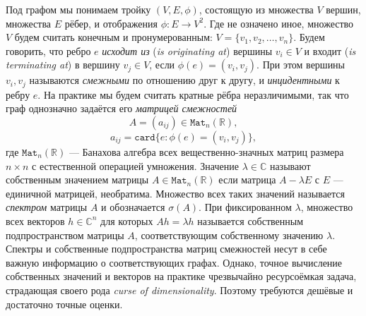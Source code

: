 \documentclass[14pt,a4paper]{extarticle}
\numberwithin{equation}{section}
\theoremstyle{definition}
\begin{document}
Под графом мы понимаем тройку \((V, E, \phi)\), состоящую
из множества \( V \) вершин, множества \( E \) рёбер,
и отображения \( \phi: E\to V^2\). Где не означено иное,
множество \( V \) будем считать конечным и пронумерованным: \( V = \{ v_1, v_2,
\ldots, v_n \}\). 
Будем говорить, что ребро \( e \) \emph{исходит из} (\emph{is originating at})
вершины \( v_i\in V \)
и входит (\emph{is terminating at}) в вершину \( v_j\in V \),
если \( \phi(e)=(v_i, v_j)\). При этом вершины \( v_i, v_j \) называются
\emph{смежными} по отношению друг к другу, и \emph{инцидентными} к ребру \( e \).
На практике мы будем считать кратные рёбра неразличимыми,
так что граф однозначно задаётся его \emph{матрицей смежностей}
\[ A = ( a_{ij} ) \in \mathtt{Mat}_n(\mathbb{R}), \]
\[ a_{ij} = \mathtt{card}\{ e: \phi(e)=(v_i, v_j)\}, \]
где \( \mathtt{Mat}_n(\mathbb{R}) \) --- Банахова алгебра всех
вещественно-значных матриц размера
\( n{\times}n \) с естественной операцией умножения.
Значение \( \lambda \in \mathbb{C} \) называют собственным значением
матрицы \(
A\in\mathtt{Mat}_n(\mathbb{R}) \) если матрица \( A - \lambda E \) с \( E \) --- единичной
матрицей, необратима. Множество всех таких значений называется
\emph{спектром} матрицы \( A \) и обозначается \( \sigma(A) \).
При фиксированном \( \lambda \),  множество всех векторов \( h\in\mathbb{C}^n \)
для которых \( A h = \lambda h \) называется собственным подпространством матрицы
\( A \), соответствующим собственному значению \( \lambda \).
Спектры и собственные подпространства матриц смежностей несут в себе важную
информацию о соответствующих графах. Однако, точное вы\-числ\-ение собств\-енных
значений и век\-торов на практике чрез\-вычайно ресурсо\-ёмкая задача, страдающая
своего рода \emph{curse of dimensionality}. Поэтому требуются дешёвые и
дос\-таточно точные оценки.
\end{document}
